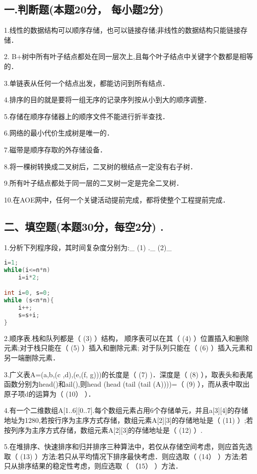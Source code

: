 
\subsection{一.判断题(本题20分， 每小题2分)}

1.线性的数据结构可以顺序存储，也可以链接存储;非线性的数据结构只能链接存储．

2. B+树中所有叶子结点都处在同一层次上,且每个叶子结点中关键字个数都是相等的．

3.单链表从任何一个结点出发，都能访问到所有结点．

4.排序的目的就是要将一组无序的记录序列按从小到大的顺序调整．

5.存储在顺序存储器上的顺序文件不能进行折半查找．

6.网络的最小代价生成树是唯一的．

7.磁带是顺序存取的外存储设备．

8.将一棵树转换成二叉树后，二叉树的根结点一定没有右子树．

9.所有叶子结点都处于同一层的二叉树一定是完全二叉树．

10.在AOE网中，任何一个关键活动提前完成，都将使整个工程提前完成．

\subsection{二、填空题(本题30分，每空2分) .}

1.分析下列程序段，其时间复杂度分别为:\_ (1) .\_ (2)\_
\begin{lstlisting}[language=cpp]
i=1;
while(i<=n*n)
    i=i*2;

int i=0, s=0;
while (s<n*n){
    i++;
    s=s+i;
}
\end{lstlisting}

2.顺序表.栈和队列都是（ (3) ）结构， 顺序表可以在其（ (4) ）位置插入和删除元素;对于栈只能在（ (5) ）插入和删除元素; 对于队列只能在（ (6) ）插入元素和另一端删除元素．

3.广义表A=(a,b,(c ,d),(e,(f, g)))的长度是（ (7) )．深度是（ (8) ），取表头和表尾函数分别为head()和ail(),则head (head (tail (tail (A))))=（ (9) ），而从表中取出原子项d的运算为（ (10） ）．

4.有一个二维数组A[1..6][0..7].每个数组元素占用6个存储单元，并且a[3][4]的存储地址为1280,若按行序为主序方式存储，数组元素A[2][3]的存储地址是（ (11) ）;若按列序为主序方式存储，数组元素A[2][3]的存储地址是（ (12) ）.

5.在堆排序、快速排序和归并排序三种算法中，若仅从存储空间考虑，则应首先选取（ (13) ）方法:若只从平均情况下排序最快考虑．则应选取（ (14） ）方法;若只从排序结果的稳定性考虑，则应选取（ （15） ）方法．

